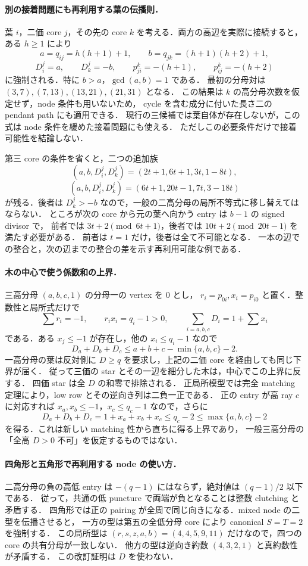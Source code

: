 


\paragraph{別の接着問題にも再利用する葉の伝播則．}
葉 $i$，二価 core $j$，その先の core $k$ を考える．両方の高辺を実際に接続すると，
ある $h\geq1$ により
\[
 a=q_{ij}=h(h+1)+1,\qquad b=q_{jk}=(h+1)(h+2)+1,
\]
\[
 D^j_i=a,\qquad D^j_k=-b,\qquad
 p^k_{ji}=-(h+1),\qquad p^k_{ij}=-(h+2)
\]
に強制される．特に $b>a$，$\gcd(a,b)=1$ である．
最初の分母対は $(3,7),(7,13),(13,21),(21,31)$ となる．
この結果は $k$ の高分母次数を仮定せず，node 条件も用いないため，
cycle を含む成分に付いた長さ二の pendant path にも適用できる．
現行の三候補では葉自体が存在しないが，この式は node 条件を緩めた接着問題にも使える．
ただしこの必要条件だけで接着可能性を結論しない．

第三 core の条件を省くと，二つの追加族
\[
 (a,b,D^j_i,D^j_k)=(2t+1,6t+1,3t,1-8t),
\]
\[
 (a,b,D^j_i,D^j_k)=(6t+1,20t-1,7t,3-18t)
\]
が残る．後者は $D^j_k>-b$ なので，一般の二高分母の局所不等式に移し替えてはならない．
ところが次の core から元の葉へ向かう entry は $b-1$ の signed divisor で，
前者では $3t+2\pmod{6t+1}$，後者では $10t+2\pmod{20t-1}$ を満たす必要がある．
前者は $t=1$ だけ，後者は全て不可能となる．
一本の辺での整合と，次の辺までの整合の差を示す再利用可能な例である．

\paragraph{木の中心で使う係数和の上界．}
三高分母 $(a,b,c,1)$ の分母一の vertex を $0$ とし，
$r_i=p_{0i},x_i=p_{i0}$ と置く．整数性と局所式だけで
\[
 \sum r_i=-1,\qquad r_ix_i=q_i-1>0,\qquad
 \sum_{i=a,b,c}D_i=1+\sum x_i
\]
である．ある $x_j\leq-1$ が存在し，他の $x_i\leq q_i-1$ なので
\[
 D_a+D_b+D_c\leq a+b+c-\min\{a,b,c\}-2.
\]
一高分母の葉は反対側に $D\geq q$ を要求し，上記の二価 core を経由しても同じ下界が届く．
従って三価の star とその一辺を細分した木は，中心でこの上界に反する．
四価 star は全 $D$ の和零で排除される．
正局所模型では完全 matching 定理により，low row とその逆向き列は二負一正である．
正の entry が高 ray $c$ に対応すれば $x_a,x_b\le-1$，$x_c\le q_c-1$ なので，さらに
\[
 D_a+D_b+D_c=1+x_a+x_b+x_c\le q_c-2\le\max\{a,b,c\}-2
\]
を得る．これは新しい matching 性から直ちに得る上界であり，
一般三高分母の「全高 $D>0$ 不可」を仮定するものではない．

\paragraph{四角形と五角形で再利用する node の使い方．}
二高分母の負の高低 entry は $-(q-1)$ にはならず，絶対値は $(q-1)/2$ 以下である．
従って，共通の低 puncture で両端が負となることは整数 clutching と矛盾する．
四角形では正の pairing が全周で同じ向きになる．mixed node の二型を伝播させると，
一方の型は第五の全低分母 core により canonical $S=T=2$ を強制する．
この局所型は $(r,s,z,a,b)=(4,4,5,9,11)$ だけなので，四つの core の共有分母が一致しない．
他方の型は逆向き約数 $(4,3,2,1)$ と真約数性が矛盾する．
この改訂証明は $D$ を使わない．

